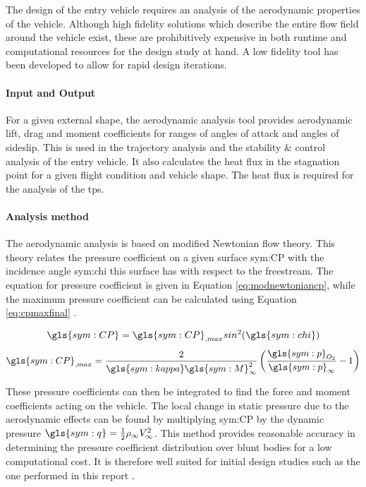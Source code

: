 The design of the entry vehicle requires an analysis of the aerodynamic properties of the vehicle. Although high fidelity solutions which describe the entire flow field around the vehicle exist, these are prohibitively expensive in both runtime and computational resources for the design study at hand. A low fidelity tool has been developed to allow for rapid design iterations. 

\paragraph{Input and Output}
For a given external shape, the aerodynamic analysis tool provides aerodynamic lift, drag and moment coefficients for ranges of angles of attack and angles of sideslip. This is used in the trajectory analysis and the stability \& control analysis of the entry vehicle. It also calculates the heat flux in the stagnation point for a given flight condition and vehicle shape. The heat flux is required for the analysis of the \gls{tps}. 

\paragraph{Analysis method}
The aerodynamic analysis is based on modified Newtonian flow theory. This theory relates the pressure coefficient on a given surface \gls{sym:CP} with the incidence angle \gls{sym:chi} this surface has with respect to the freestream. The equation for pressure coefficient is given in Equation \ref{eq:modnewtoniancp}, while the maximum pressure coefficient can be calculated using Equation \ref{eq:cpmaxfinal}  \cite{AndersonJr.2006}.

\begin{multicols}{2}
	\begin{equation}
		\gls{sym:CP}=\gls{sym:CP}_{,max}sin^{2}(\gls{sym:chi})
		\label{eq:modnewtoniancp}
	\end{equation} \break
	\begin{equation}
		\gls{sym:CP}_{,max} = \frac{2}{\gls{sym:kappa} \gls{sym:M}_{\infty}^{2}}\left(\frac{\gls{sym:p}_{O_{2}}}{\gls{sym:p}_{\infty}}-1\right)
		\label{eq:cpmaxfinal}
	\end{equation}
\end{multicols}

These pressure coefficients can then be integrated to find the force and moment coefficients acting on the vehicle. The local change in static pressure due to the aerodynamic effects can be found by multiplying \gls{sym:CP} by the dynamic pressure $\gls{sym:q}=\frac{1}{2}\rho_{\infty}V_{\infty}^{2}$. This method provides reasonable accuracy in determining the pressure coefficient distribution over blunt bodies for a low computational cost. It is therefore well suited for initial design studies such as the one performed in this report \cite{AndersonJr.2006}.

